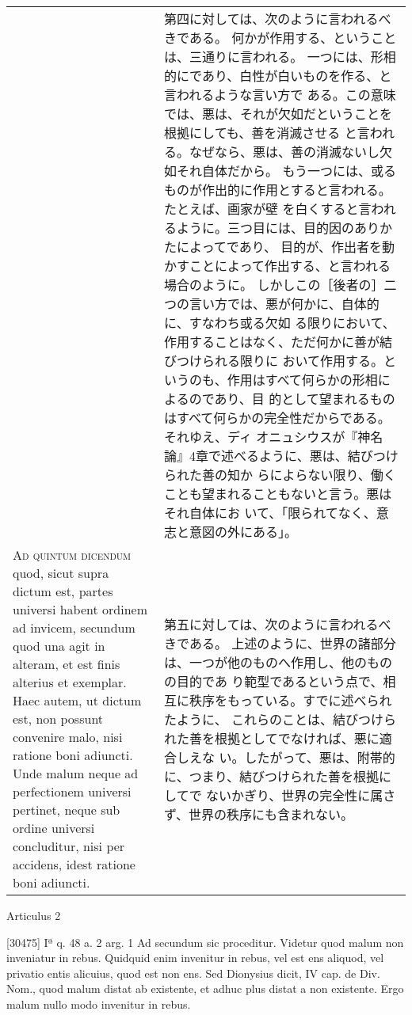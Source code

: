 \documentclass[10pt]{jsarticle} %
\begin{document}
\begin{longtable}{p{21em}p{21em}}
&

第四に対しては、次のように言われるべきである。
何かが作用する、ということは、三通りに言われる。
一つには、形相的にであり、白性が白いものを作る、と言われるような言い方で
 ある。この意味では、悪は、それが欠如だということを根拠にしても、善を消滅させる
 と言われる。なぜなら、悪は、善の消滅ないし欠如それ自体だから。
もう一つには、或るものが作出的に作用とすると言われる。たとえば、画家が壁
 を白くすると言われるように。三つ目には、目的因のありかたによってであり、
 目的が、作出者を動かすことによって作出する、と言われる場合のように。
しかしこの［後者の］二つの言い方では、悪が何かに、自体的に、すなわち或る欠如
 る限りにおいて、作用することはなく、ただ何かに善が結びつけられる限りに
 おいて作用する。というのも、作用はすべて何らかの形相によるのであり、目
 的として望まれるものはすべて何らかの完全性だからである。それゆえ、ディ
 オニュシウスが『神名論』4章で述べるように、悪は、結びつけられた善の知か
 らによらない限り、働くことも望まれることもないと言う。悪はそれ自体にお
 いて、「限られてなく、意志と意図の外にある」。

\\


{\scshape Ad quintum dicendum} quod, sicut supra dictum est, partes
 universi habent ordinem ad invicem, secundum quod una agit in alteram,
 et est finis alterius et exemplar. Haec autem, ut dictum est, non
 possunt convenire malo, nisi ratione boni adiuncti. Unde malum neque ad
 perfectionem universi pertinet, neque sub ordine universi concluditur,
 nisi per accidens, idest ratione boni adiuncti.


&

第五に対しては、次のように言われるべきである。
上述のように、世界の諸部分は、一つが他のものへ作用し、他のものの目的であ
 り範型であるという点で、相互に秩序をもっている。すでに述べられたように、
 これらのことは、結びつけられた善を根拠としてでなければ、悪に適合しえな
 い。したがって、悪は、附帯的に、つまり、結びつけられた善を根拠にしてで
 ないかぎり、世界の完全性に属さず、世界の秩序にも含まれない。


\end{longtable}
\newpage

Articulus 2

[30475] Iª q. 48 a. 2 arg. 1 Ad secundum sic proceditur. Videtur quod malum non inveniatur in rebus. Quidquid enim invenitur in rebus, vel est ens aliquod, vel privatio entis alicuius, quod est non ens. Sed Dionysius dicit, IV cap. de Div. Nom., quod malum distat ab existente, et adhuc plus distat a non existente. Ergo malum nullo modo invenitur in rebus.
\end{document}
